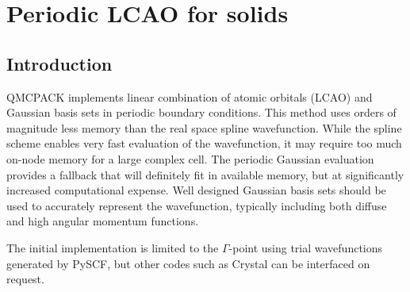 \chapter{Periodic LCAO for solids}
\label{chap:LCAO}

\section{Introduction}

QMCPACK implements linear combination of atomic orbitals (LCAO) and Gaussian
basis sets in periodic boundary conditions. This method uses orders of
magnitude less memory than the real space spline wavefunction. While
the spline scheme enables very fast evaluation of the wavefunction, it may
require too much on-node memory for a large complex cell. The periodic
Gaussian evaluation provides a fallback that will definitely fit in
available memory, but at significantly increased computational
expense. Well designed Gaussian basis sets should be used to accurately
represent the wavefunction, typically
including both diffuse and high angular momentum functions.

The initial implementation is limited to the $\Gamma$-point using
trial wavefunctions generated by PySCF\cite{Sun2018}, but other codes such as
Crystal can be interfaced on request.


